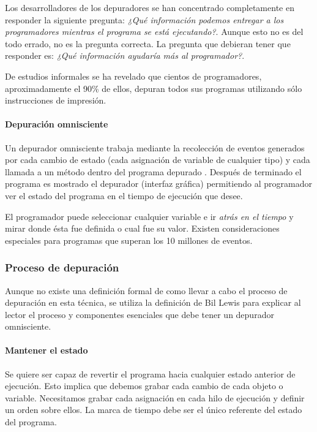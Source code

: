 \documentclass[12pt,legalpaper]{report}
\begin{document}
Los desarrolladores de los depuradores se han concentrado completamente en responder la siguiente pregunta: \textit{¿Qué información podemos entregar a los programadores mientras el programa se está ejecutando?}.  Aunque esto no es del todo errado, no es la pregunta correcta.  La pregunta que debieran tener que responder es: \textit{¿Qué información ayudaría más al programador?}.

De estudios informales \cite{odb} se ha revelado que cientos de programadores, aproximadamente el 90\% de ellos, depuran todos sus programas utilizando sólo instrucciones de impresión.


			\paragraph{Depuración omnisciente}

Un depurador omnisciente trabaja mediante la recolección de eventos generados por cada cambio de estado (cada asignación de variable de cualquier tipo) y cada llamada a un método dentro del programa depurado \cite{odb} \cite{tod}.  Después de terminado el programa es mostrado el depurador (interfaz gráfica) permitiendo al programador ver el estado del programa en el tiempo de ejecución que desee.  

El programador puede seleccionar cualquier variable e ir \textit{atrás en el tiempo} y mirar donde ésta fue definida o cual fue su valor. Existen consideraciones especiales para programas que superan los 10 millones de eventos.


			\subsubsection{Proceso de depuración}

Aunque no existe una definición formal de como llevar a cabo el proceso de depuración en esta técnica, se utiliza la definición de Bil Lewis \cite{odb} para explicar al lector el proceso y componentes esenciales que debe tener un depurador omnisciente.

				\paragraph{Mantener el estado}

Se quiere ser capaz de revertir el programa hacia cualquier estado anterior de ejecución.  Esto implica que debemos grabar cada cambio de cada objeto o variable.  Necesitamos grabar cada asignación en cada hilo de ejecución y definir un orden sobre ellos.  La marca de tiempo debe ser el único referente del estado del programa.
\end{document}
